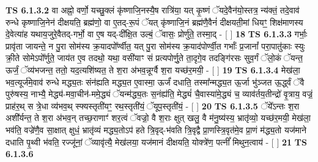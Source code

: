 \documentclass[17pt]{extarticle}
\begin{document}
                  \newline
                                \textbf{ TS 6.1.3.2} \newline
                  वा अह्नो॒ वर्णो॒ यच्छु॒क्लं कृ॑ष्णाजि॒नस्यै॒ष रात्रि॑या॒ यत् कृ॒ष्णं ॅयदे॒वैन॑यो॒स्तत्र॒ न्य॑क्तं॒ तदे॒वाव॑ रुन्धे कृष्णाजि॒नेन॑ दीक्षयति॒ ब्रह्म॑णो॒ वा ए॒तद्-रू॒पं ॅयत् कृ॑ष्णाजि॒नं ब्रह्म॑णै॒वैनं॑ दीक्षयती॒मां धियꣳ॒॒ शिक्ष॑माणस्य दे॒वेत्या॑ह यथाय॒जुरे॒वैतद्-गर्भो॒ वा ए॒ष यद्-दी᳚क्षि॒त उल्बं॒ ॅवासः॒ प्रोर्णु॑ते॒ तस्मा॒द् - [  ] \textbf{  18} \newline
                  \newline
                                \textbf{ TS 6.1.3.3} \newline
                  गर्भाः॒ प्रावृ॑ता जायन्ते॒ न पु॒रा सोम॑स्य क्र॒यादपो᳚र्ण्वीत॒ यत् पु॒रा सोम॑स्य क्र॒याद॑पोर्ण्वी॒त गर्भाः᳚ प्र॒जानां᳚ परा॒पातु॑काः स्युः क्री॒ते सोमेऽपो᳚र्णुते॒ जाय॑त ए॒व तदथो॒ यथा॒ वसी॑याꣳ सं प्रत्यपोर्णु॒ते ता॒दृगे॒व तदङ्गि॑रसः सुव॒र्गं ॅलो॒कं ॅयन्त॒ ऊर्जं॒ ॅव्य॑भजन्त॒ ततो॒ यद॒त्यशि॑ष्यत॒ ते श॒रा अ॑भव॒न्नूर्ग्वै श॒रा यच्छ॑र॒मयी॒ - [  ] \textbf{  19} \newline
                  \newline
                                \textbf{ TS 6.1.3.4} \newline
                  मेख॑ला॒ भव॒त्यूर्ज॑मे॒वाव॑ रुन्धे मद्ध्य॒तः संन॑ह्यति मद्ध्य॒त ए॒वास्मा॒ ऊर्जं॑ दधाति॒ तस्मा᳚न्मद्ध्य॒त ऊ॒र्जा भु॑ञ्जत ऊ॒र्द्ध्वं ॅवै पुरु॑षस्य॒ नाभ्यै॒ मेद्ध्य॑-मवा॒चीन॑-ममे॒द्ध्यं ॅयन्म॑द्ध्य॒तः स॒नंह्य॑ति॒ मेद्ध्यं॑ चै॒वास्या॑मे॒द्ध्यं च॒ व्याव॑र्तय॒तीन्द्रो॑ वृ॒त्राय॒ वज्रं॒ प्राह॑र॒थ् स त्रे॒धा व्य॑भव॒थ् स्फ्यस्तृती॑यꣳ॒॒ रथ॒स्तृती॑यं॒ ॅयूप॒स्तृती॑यं॒ - [  ] \textbf{  20} \newline
                  \newline
                                \textbf{ TS 6.1.3.5} \newline
                  ॅये᳚ऽन्तः श॒रा अशी᳚र्यन्त॒ ते श॒रा अ॑भव॒न् तच्छ॒राणाꣳ॑ शर॒त्वं ॅवज्रो॒ वै श॒राः क्षुत् खलु॒ वै म॑नु॒ष्य॑स्य॒ भ्रातृ॑व्यो॒ यच्छ॑र॒मयी॒ मेख॑ला॒ भव॑ति॒ वज्रे॑णै॒व सा॒क्षात् क्षुधं॒ भ्रातृ॑व्यं मद्ध्य॒तोऽप॑ हते त्रि॒वृद्-भ॑वति त्रि॒वृद्वै प्रा॒णस्त्रि॒वृत॑मे॒व प्रा॒णं म॑द्ध्य॒तो यज॑माने दधाति पृ॒थ्वी भ॑वति॒ रज्जू॑नां॒ ॅव्यावृ॑त्यै॒ मेख॑लया॒ यज॑मानं दीक्षयति॒ योक्त्रे॑ण॒ पत्नीं᳚ मिथुन॒त्वाय॑ - [  ] \textbf{  21} \newline
                  \newline
                                \textbf{ TS 6.1.3.6} \newline
\end{document}
